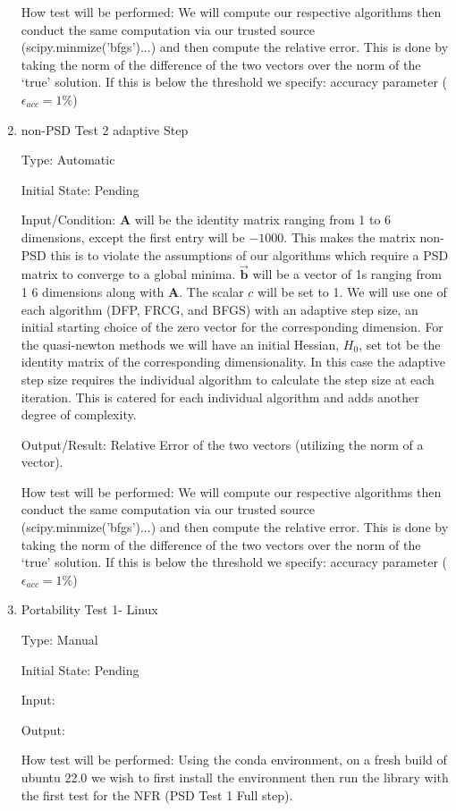 \documentclass[12pt, titlepage]{article}
\begin{document}
\begin{enumerate}
How test will be performed: We will compute our respective algorithms then conduct the same 
computation via our trusted source (scipy.minmize('bfgs')...) and then compute the relative 
error. This is done by taking the norm of the difference of the two vectors over the norm of
the `true' solution. If this is below the threshold we specify: accuracy parameter ($\epsilon_{acc} = 1\%$) 

\item{non-PSD Test 2 adaptive Step}\

Type: Automatic
					
Initial State: Pending
					
Input/Condition: $\mathbf{A}$ will be the identity matrix ranging from
1 to 6 dimensions, except the first entry will be $-1000$. This makes the matrix non-PSD
this is to violate the assumptions of our algorithms which require a PSD matrix to converge 
to a global minima. $\mathbf{\vec{b}}$ will be a vector of 1s ranging from 1 
6 dimensions along with $\mathbf{A}$. The scalar $c$ will be set to 1. We will
use one of each algorithm (DFP, FRCG, and BFGS) with an adaptive step size,
an initial starting choice of the zero vector for the corresponding dimension. For the 
quasi-newton methods we will have an initial Hessian, $H_{0}$, set tot be the identity 
matrix of the corresponding dimensionality. In this case the adaptive step size requires 
the individual algorithm to calculate the step size at each iteration. This is catered for 
each individual algorithm and adds another degree of complexity.
					
Output/Result: Relative Error of the two vectors (utilizing the norm of a vector). 
					
How test will be performed: We will compute our respective algorithms then conduct the same 
computation via our trusted source (scipy.minmize('bfgs')...) and then compute the relative 
error. This is done by taking the norm of the difference of the two vectors over the norm of
the `true' solution. If this is below the threshold we specify: accuracy parameter ($\epsilon_{acc} = 1\%$) 

\item{Portability Test 1- Linux\\}

Type: Manual 
					
Initial State: Pending
					
Input: 
					
Output: 
					
How test will be performed: Using the conda environment, on a fresh build of ubuntu 22.0
we wish to first install the environment then run the library with the first test for the 
NFR (PSD Test 1 Full step).


\end{enumerate}
\end{document}
